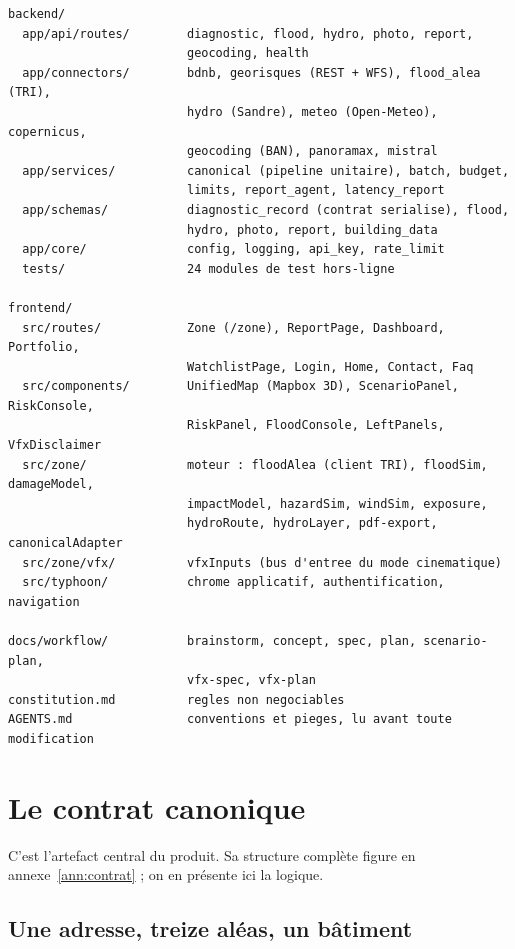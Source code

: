 \begin{lstlisting}[caption={Organisation des fichiers du projet (simplifiée).},
label={lst:arbo}]
backend/
  app/api/routes/        diagnostic, flood, hydro, photo, report,
                         geocoding, health
  app/connectors/        bdnb, georisques (REST + WFS), flood_alea (TRI),
                         hydro (Sandre), meteo (Open-Meteo), copernicus,
                         geocoding (BAN), panoramax, mistral
  app/services/          canonical (pipeline unitaire), batch, budget,
                         limits, report_agent, latency_report
  app/schemas/           diagnostic_record (contrat serialise), flood,
                         hydro, photo, report, building_data
  app/core/              config, logging, api_key, rate_limit
  tests/                 24 modules de test hors-ligne

frontend/
  src/routes/            Zone (/zone), ReportPage, Dashboard, Portfolio,
                         WatchlistPage, Login, Home, Contact, Faq
  src/components/        UnifiedMap (Mapbox 3D), ScenarioPanel, RiskConsole,
                         RiskPanel, FloodConsole, LeftPanels, VfxDisclaimer
  src/zone/              moteur : floodAlea (client TRI), floodSim, damageModel,
                         impactModel, hazardSim, windSim, exposure,
                         hydroRoute, hydroLayer, pdf-export, canonicalAdapter
  src/zone/vfx/          vfxInputs (bus d'entree du mode cinematique)
  src/typhoon/           chrome applicatif, authentification, navigation

docs/workflow/           brainstorm, concept, spec, plan, scenario-plan,
                         vfx-spec, vfx-plan
constitution.md          regles non negociables
AGENTS.md                conventions et pieges, lu avant toute modification
\end{lstlisting}

\section{Le contrat canonique}

C'est l'artefact central du produit. Sa structure complète figure en
annexe~\ref{ann:contrat} ; on en présente ici la logique.

\subsection{Une adresse, treize aléas, un bâtiment}

